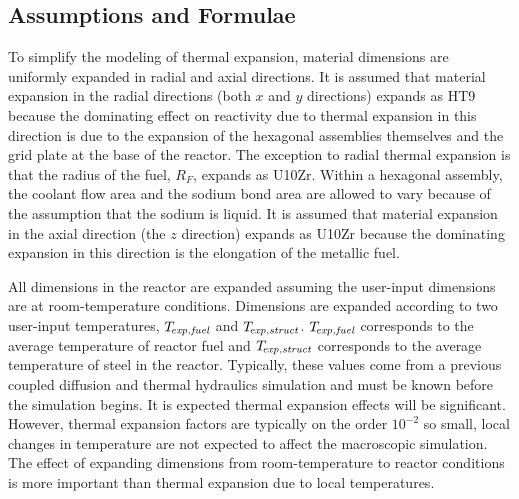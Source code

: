   \subsection{Assumptions and Formulae}
  \label{sec:model_details__assumptions_and_formulae}
    To simplify the modeling of thermal expansion, material dimensions are
    uniformly expanded in radial and axial directions. It is assumed that 
    material expansion in the radial directions (both $x$ and $y$ directions) 
    expands as HT9 because the dominating effect on reactivity due to thermal 
    expansion in this direction is due to the expansion of the hexagonal 
    assemblies themselves and the grid plate at the base of the reactor. The 
    exception to radial thermal expansion is that the radius of the fuel, 
    $R_F$, expands as U10Zr. Within a hexagonal assembly, the coolant flow area 
    and the sodium bond area are allowed to vary because of the assumption that 
    the sodium is liquid. It is assumed that material expansion in the axial 
    direction (the $z$ direction) expands as U10Zr because the dominating 
    expansion in this direction is the elongation of the metallic fuel.
    
    All dimensions in the reactor are expanded assuming the user-input
    dimensions are at room-temperature conditions. Dimensions are expanded
    according to two user-input temperatures, ${T_{\!\mbox{\scriptsize \em exp,fuel}}}$ and $T_{\!\mbox{\scriptsize \em exp,struct}}$.
    ${T_{\!\mbox{\scriptsize \em exp,fuel}}}$ corresponds to the average temperature of reactor fuel and
    $T_{\!\mbox{\scriptsize \em exp,struct}}$ corresponds to the average temperature of steel in the
    reactor. Typically, these values come from a previous coupled diffusion and
    thermal hydraulics simulation and must be known before the simulation
    begins. It is expected thermal expansion effects will be significant.
    However, thermal expansion factors are typically on the order $10^{-2}$ so
    small, local changes in temperature are not expected to affect the
    macroscopic simulation. The effect of expanding dimensions from
    room-temperature to reactor conditions is more important than thermal
    expansion due to local temperatures.

